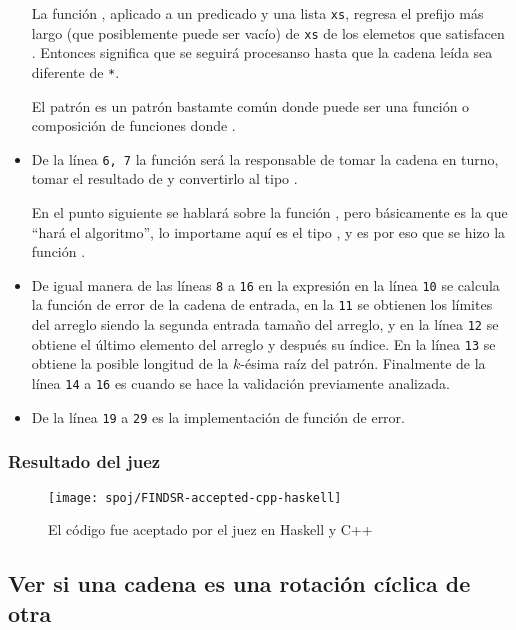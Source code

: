 \begin{itemize}
La función , aplicado a un predicado  y
una lista \texttt{xs}, regresa el prefijo más largo (que posiblemente puede ser vacío) de
\texttt{xs} de los elemetos que satisfacen .
Entonces  significa que se seguirá procesanso hasta que la cadena leída
sea diferente de \texttt{*}.

El patrón  es un patrón bastamte común donde  puede ser una
función o composición de funciones donde .

\item De la línea \texttt{6, 7} la función  será la responsable de tomar la cadena en
turno, tomar el resultado de  y convertirlo al tipo .

En el punto siguiente se hablará sobre la función , pero básicamente es
la que ``hará el algoritmo'', lo importame aquí es el tipo , y es por eso que se hizo
la función .

\item De igual manera de las líneas \texttt{8} a \texttt{16} en la expresión 
en la línea \texttt{10} se calcula la función de error de la cadena de entrada, en la \texttt{11}
se obtienen los límites del arreglo siendo la segunda entrada tamaño del arreglo, y en la línea
\texttt{12} se obtiene el último elemento del arreglo y después su índice. En la línea \texttt{13}
se obtiene la posible longitud de la $k$-ésima raíz del patrón. Finalmente de la línea \texttt{14}
a \texttt{16} es cuando se hace la validación previamente analizada.

\item De la línea \texttt{19} a \texttt{29} es la implementación de función de error.
\end{itemize}

\subsubsection{Resultado del juez}
\begin{figure}[H]
\centering
\texttt{[image: spoj/FINDSR-accepted-cpp-haskell]}
\caption{El código fue aceptado por el juez en Haskell y C++}
\end{figure}

\newpage


\subsection{Ver si una cadena es una rotación cíclica de otra}

